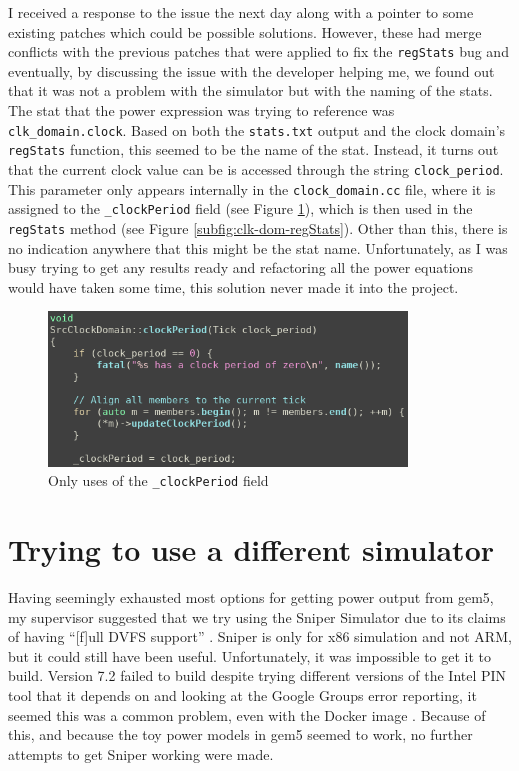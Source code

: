     I received a response to the issue the next day along with a pointer to 
    some existing patches which could be possible solutions. However, these had 
    merge conflicts with the previous patches that were applied to fix the 
    \texttt{regStats} bug and eventually, by discussing the issue with the 
    developer helping me, we found out that it was not a problem with the 
    simulator but with the naming of the stats. The stat that the power 
    expression was trying to reference was \texttt{clk\_domain.clock}. Based on 
    both the \texttt{stats.txt} output and the clock domain's \texttt{regStats} 
    function, this seemed to be the name of the stat. Instead, it turns out 
    that the current clock value can be is accessed through the string 
    \texttt{clock\_period}. This parameter only appears internally in the 
    \texttt{clock\_domain.cc} file, where it is assigned to the 
    \texttt{\_clockPeriod} field (see Figure \ref{fig:clock-period-src}), which 
    is then used in the \texttt{regStats} method (see Figure 
    \ref{subfig:clk-dom-regStats}). Other than this, there is no indication 
    anywhere that this might be the stat name. Unfortunately, as I was busy 
    trying to get any results ready and refactoring all the power equations 
    would have taken some time, this solution never made it into the project.
    \begin{figure}[H]
        \centering
        \includegraphics[width=0.85\textwidth]{screenshots/power-model-eldritchness/clock-period-src.png}
        \caption{Only uses of the \texttt{\_clockPeriod} field}
        \label{fig:clock-period-src}
    \end{figure}

\section{Trying to use a different simulator}
Having seemingly exhausted most options for getting power output from gem5, my 
supervisor suggested that we try using the Sniper Simulator 
\cite{carlson_sniper_2011,carlson_evaluation_2014} due to its claims of having 
``[f]ull DVFS support'' \cite{noauthor_sniper_2020}. Sniper is only for x86 
simulation and not ARM, but it could still have been useful. Unfortunately, it 
was impossible to get it to build. Version 7.2 failed to build despite trying 
different versions of the Intel PIN tool that it depends on 
\cite{noauthor_getting_2019} and looking at the Google Groups error reporting, 
it seemed this was a common problem, even with the Docker image 
\cite{noauthor_error_2020}. Because of this, and because the toy power models in
gem5 seemed to work, no further attempts to get Sniper working were made.
